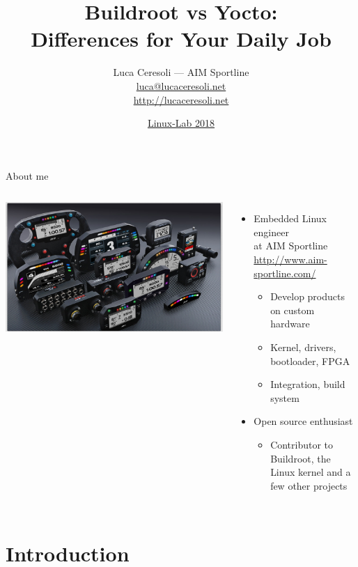 \documentclass[xetex,table,aspectratio=43]{beamer}
\title{Buildroot vs Yocto:\\Differences for Your Daily Job}
\author{Luca Ceresoli --- AIM Sportline\\
  \href{mailto:luca@lucaceresoli.net}{luca@lucaceresoli.net}\\
  \url{http://lucaceresoli.net}
}
\date{\href{https://2018.linux-lab.it/}{Linux-Lab 2018}}
\begin{document}
\maketitle

\begin{frame}{About me}
  \begin{columns}
    \includegraphics[width=\textwidth]{../common/images/aim-products.jpg}

    \begin{itemize}
    \item Embedded Linux engineer\\
      at AIM Sportline\\
      {\footnotesize\url{http://www.aim-sportline.com/}}
      \begin{itemize}
      \item Develop products on custom hardware
      \item Kernel, drivers, bootloader, FPGA
      \item Integration, build system
      \end{itemize}
    \item Open source enthusiast
      \begin{itemize}
      \item Contributor to Buildroot, the Linux kernel and a few other
        projects
      \end{itemize}
    \end{itemize}
  \end{columns}
\end{frame}


\section{Introduction}
\end{document}
